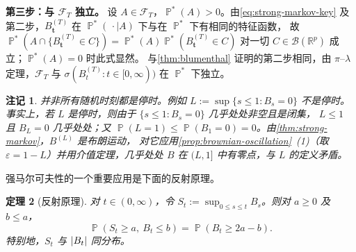 \documentclass[UTF8,11pt,a4paper,oneside,fontset=fandol]{ctexrep}
\makeatletter
\numberwithin{equation}{section}
\theoremstyle{zhthm}
\newtheorem{theorem}{定理}[section]
\newtheorem{remark}[theorem]{注记}
\renewenvironment{proof}[1][\proofname]{\par
  \pushQED{\qed}%
  \normalfont\topsep6\p@\@plus6\p@\relax
  \trivlist
  \item[\hskip\labelsep\bfseries#1\hspace{0.5em}]\ignorespaces
}{%
  \popQED\endtrivlist\@endpefalse
}
\renewcommand{\proofname}{证明}
\newcommand{\R}{\mathbb{R}}
\newcommand{\B}{\mathcal{B}}
\newcommand{\F}{\mathcal{F}}
\DeclareMathOperator{\Prob}{\mathbb{P}}
\DeclarePairedDelimiter{\abs}{\lvert}{\rvert}
\makeatother
\begin{document}
\begin{proof}
\textbf{\boldmath 第三步：与 $\F_T$ 独立。}
设 $A\in\F_T$，$\Prob^*(A)>0$。由\cref{eq:strong-markov-key} 及第二步，$B^{(T)}_{\bm t}$ 在 $\Prob^*(\,\cdot\mid A)$ 下与在 $\Prob^*$ 下有相同的特征函数，
故 $\Prob^*(A\cap\{B^{(T)}_{\bm t}\in C\})=\Prob^*(A)\Prob^*(B^{(T)}_{\bm t}\in C)$ 对一切 $C\in\B(\R^p)$ 成立；$\Prob^*(A)=0$ 时此式显然。
与\cref{thm:blumenthal} 证明的第二步相同，由 $\pi$--$\lambda$ 定理，$\F_T$ 与 $\sigma(B^{(T)}_t:t\in[0,\infty))$ 在 $\Prob^*$ 下独立。
\end{proof}

\begin{remark}
\label{rem:last-zero-not-stopping}
并非所有随机时刻都是停时。例如 $L:=\sup\{s\le1:B_s=0\}$ 不是停时。事实上，若 $L$ 是停时，则由于 $\{s\le1:B_s=0\}$ 几乎处处非空且是闭集，
$L\le1$ 且 $B_L=0$ 几乎处处；又 $\Prob(L=1)\le\Prob(B_1=0)=0$。由\cref{thm:strong-markov}，$B^{(L)}$ 是布朗运动，
对它应用\cref{prop:brownian-oscillation}~(1)（取 $\varepsilon=1-L$）并用介值定理，几乎处处 $B$ 在 $(L,1]$ 中有零点，与 $L$ 的定义矛盾。
\end{remark}

强马尔可夫性的一个重要应用是下面的反射原理。

\begin{theorem}[反射原理]
\label{thm:reflection-principle}
对 $t\in(0,\infty)$，令 $S_t:=\sup_{0\le s\le t}B_s$。则对 $a\ge0$ 及 $b\le a$，
\[
  \Prob(S_t\ge a,\ B_t\le b)=\Prob(B_t\ge2a-b).
\]
特别地，$S_t$ 与 $\abs{B_t}$ 同分布。
\end{theorem}
\end{document}

